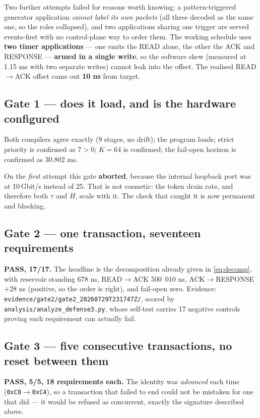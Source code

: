 \documentclass[10pt,a4paper,oneside]{article}
\newcommand{\num}[1]{\mbox{#1}}
\newcommand{\code}[1]{\texttt{\small #1}}
\begin{document}
Two further attempts failed for reasons worth knowing: a pattern-triggered generator
application \emph{cannot label its own packets} (all three decoded as the same one, so the
roles collapsed), and two applications sharing one trigger are served events-first with no
control-plane way to order them. The working schedule uses \textbf{two timer applications}
--- one emits the READ alone, the other the ACK and RESPONSE --- \textbf{armed in a single
write}, so the software skew (measured at \num{1.15} ms with two separate writes) cannot
leak into the offset. The realised READ$\to$ACK offset came out \textbf{10 ns} from target.

\subsection{Gate 1 --- does it load, and is the hardware configured}

Both compilers agree exactly (9 stages, no drift); the program loads; strict priority is
confirmed as $7>0$; $K=64$ is confirmed; the fail-open horizon is confirmed as
\num{30.802} ms.

On the \emph{first} attempt this gate \textbf{aborted}, because the internal loopback port
was at 10\,Gbit/s instead of 25. That is not cosmetic: the token drain rate, and therefore
both $\tau$ and $H$, scale with it. The check that caught it is now permanent and blocking.

\subsection{Gate 2 --- one transaction, seventeen requirements}

\textbf{PASS, 17/17.} The headline is the decomposition already given in
\eqref{eq:decomp}, with reservoir standing \num{678} ns, READ$\to$ACK \num{500 010} ns,
ACK$\to$RESPONSE $+28$ ns (positive, so the order is right), and fail-open zero. Evidence:
\code{evidence/gate2/gate2\_20260729T231747Z/}, scored by
\code{analysis/analyze\_defense3.py}, whose self-test carries 17 negative controls proving
each requirement can actually fail.

\subsection{Gate 3 --- five consecutive transactions, no reset between them}

\textbf{PASS, 5/5, 18 requirements each.} The identity was \emph{advanced} each time
(\code{0xC0}$\to$\code{0xC4}), so a transaction that failed to end could not be mistaken for
one that did --- it would be refused as concurrent, exactly the signature described above.
\end{document}
